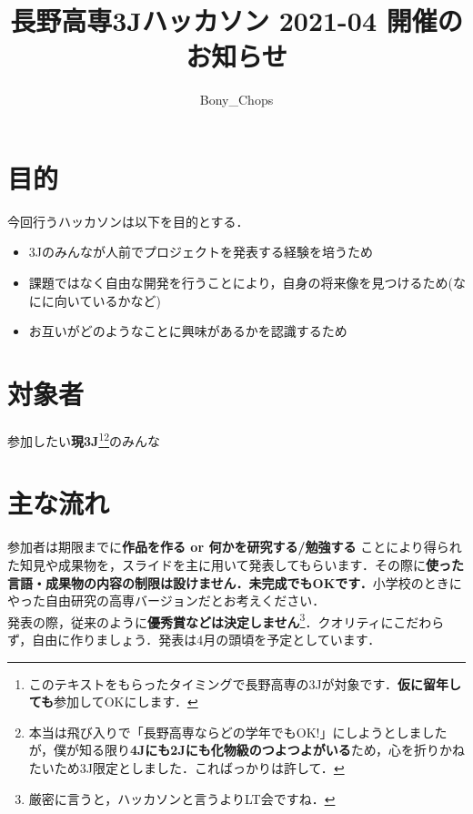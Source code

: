 \documentclass[a4j]{jarticle}
\title{長野高専3Jハッカソン 2021-04 開催のお知らせ}
\author{Bony\_Chops}
\begin{document}
\maketitle

\section{目的}
今回行うハッカソンは以下を目的とする．
\begin{itemize}
\item 3Jのみんなが人前でプロジェクトを発表する経験を培うため
\item 課題ではなく自由な開発を行うことにより，自身の将来像を見つけるため(なにに向いているかなど)
\item お互いがどのようなことに興味があるかを認識するため
\end{itemize}
\section{対象者}
参加したい\textbf{現3J}\footnote{このテキストをもらったタイミングで長野高専の3Jが対象です．\textbf{仮に留年しても}参加してOKにします．}\footnote{本当は飛び入りで「長野高専ならどの学年でもOK!」にしようとしましたが，僕が知る限り\textbf{4Jにも2Jにも化物級のつよつよがいる}ため，心を折りかねたいため3J限定としました．こればっかりは許して．}のみんな

\section{主な流れ}
参加者は期限までに\textbf{作品を作る or 何かを研究する/勉強する} ことにより得られた知見や成果物を，スライドを主に用いて発表してもらいます．その際に\textbf{使った言語・成果物の内容の制限は設けません．未完成でもOKです．}小学校のときにやった自由研究の高専バージョンだとお考えください．\\
\quad 発表の際，従来のように\textbf{優秀賞などは決定しません}\footnote{厳密に言うと，ハッカソンと言うよりLT会ですね．}．クオリティにこだわらず，自由に作りましょう．発表は4月の頭頃を予定としています．
\end{document}
